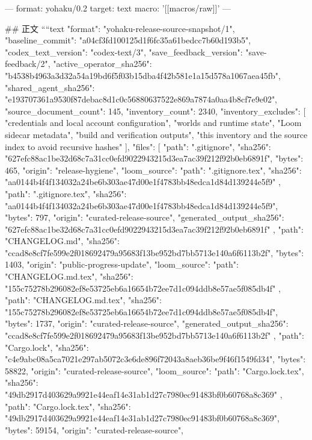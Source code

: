 ---
format: yohaku/0.2
target: text
macro: '[[macros/raw]]'
---

## 正文
````text
{
  "format": "yohaku-release-source-snapshot/1",
  "baseline_commit": "a04cf3fd100125d1f6fc35a61bedcc7b60d193b5",
  "codex_text_version": "codex-text/3",
  "save_feedback_version": "save-feedback/2",
  "active_operator_sha256": "b4538b4963a3d32a54a19bd6f5f03b15dba4f42b581e1a15d578a1067aea45fb",
  "shared_agent_sha256": "e193707361a9530f87debac8d1c0c56880637522e869a7874a0aa4b8cf7e9e02",
  "source_document_count": 145,
  "inventory_count": 2340,
  "inventory_excludes": [
    "credentials and local account configuration",
    "worlds and runtime state",
    "Loom sidecar metadata",
    "build and verification outputs",
    "this inventory and the source index to avoid recursive hashes"
  ],
  "files": [
    {
      "path": ".gitignore",
      "sha256": "627efc88ac1be32d68c7a31cc0efd9022943215d3ea7ac39f212f92b0eb6891f",
      "bytes": 465,
      "origin": "release-hygiene",
      "loom_source": {
        "path": ".gitignore.tex",
        "sha256": "aa0144b4f4f134032a24be6b303ae47d00e1f4783bb48edca1d84d139244e5f9"
      }
    },
    {
      "path": ".gitignore.tex",
      "sha256": "aa0144b4f4f134032a24be6b303ae47d00e1f4783bb48edca1d84d139244e5f9",
      "bytes": 797,
      "origin": "curated-release-source",
      "generated_output_sha256": "627efc88ac1be32d68c7a31cc0efd9022943215d3ea7ac39f212f92b0eb6891f"
    },
    {
      "path": "CHANGELOG.md",
      "sha256": "ccad8e8cf7fe599e2f018692479a95683f13be952bd7bb5713e140a6f6113b2f",
      "bytes": 1403,
      "origin": "public-progress-update",
      "loom_source": {
        "path": "CHANGELOG.md.tex",
        "sha256": "155c75278b296082ef8e53725eb6a16654b72ee7d1c094ddb8e57ae5f085db4f"
      }
    },
    {
      "path": "CHANGELOG.md.tex",
      "sha256": "155c75278b296082ef8e53725eb6a16654b72ee7d1c094ddb8e57ae5f085db4f",
      "bytes": 1737,
      "origin": "curated-release-source",
      "generated_output_sha256": "ccad8e8cf7fe599e2f018692479a95683f13be952bd7bb5713e140a6f6113b2f"
    },
    {
      "path": "Cargo.lock",
      "sha256": "c4e9abc08a5ca7021e297ab5072c3e6de896f72043a8aeb36be9f46f1549fd34",
      "bytes": 58822,
      "origin": "curated-release-source",
      "loom_source": {
        "path": "Cargo.lock.tex",
        "sha256": "49db2917d403629a9921e44eaf14e31ab1d27c7980ec91483bf0b60768a8c369"
      }
    },
    {
      "path": "Cargo.lock.tex",
      "sha256": "49db2917d403629a9921e44eaf14e31ab1d27c7980ec91483bf0b60768a8c369",
      "bytes": 59154,
      "origin": "curated-release-source",
}}
